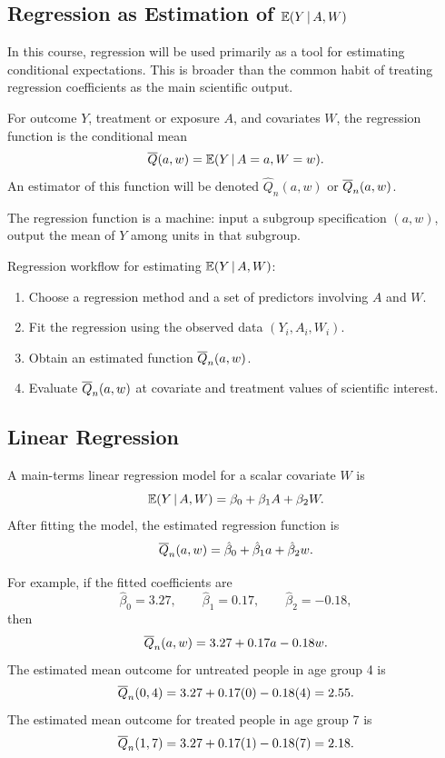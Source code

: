 \label{lec:1-7}

\subsection{Regression as Estimation of $\mathbb{E}(Y\,\vert\, A,W)$}

In this course, regression will be used primarily as a tool for estimating conditional expectations. This is broader than the common habit of treating regression coefficients as the main scientific output.

\begin{definition}
For outcome $Y$, treatment or exposure $A$, and covariates $W$, the regression function is the conditional mean
\[
\overline{Q}(a,w)=\mathbb{E}(Y\,\vert\, A=a,W=w).
\]
An estimator of this function will be denoted $\hat Q_n(a,w)$ or $\overline{Q}_n(a,w)$.
\end{definition}

The regression function is a machine: input a subgroup specification $(a,w)$, output the mean of $Y$ among units in that subgroup.

\begin{estimationbox}
Regression workflow for estimating $\mathbb{E}(Y\,\vert\, A,W)$:
\begin{enumerate}
  \item Choose a regression method and a set of predictors involving $A$ and $W$.
  \item Fit the regression using the observed data $(Y_i,A_i,W_i)$.
  \item Obtain an estimated function $\overline{Q}_n(a,w)$.
  \item Evaluate $\overline{Q}_n(a,w)$ at covariate and treatment values of scientific interest.
\end{enumerate}
\end{estimationbox}

\subsection{Linear Regression}

A main-terms linear regression model for a scalar covariate $W$ is
\[
\mathbb{E}(Y\,\vert\, A,W)=\beta_0+\beta_1A+\beta_2W.
\]
After fitting the model, the estimated regression function is
\[
\overline{Q}_n(a,w)=\hat\beta_0+\hat\beta_1a+\hat\beta_2w.
\]

For example, if the fitted coefficients are
\[
\hat\beta_0=3.27,\qquad
\hat\beta_1=0.17,\qquad
\hat\beta_2=-0.18,
\]
then
\[
\overline{Q}_n(a,w)=3.27+0.17a-0.18w.
\]
The estimated mean outcome for untreated people in age group 4 is
\[
\overline{Q}_n(0,4)=3.27+0.17(0)-0.18(4)=2.55.
\]
The estimated mean outcome for treated people in age group 7 is
\[
\overline{Q}_n(1,7)=3.27+0.17(1)-0.18(7)=2.18.
\]

